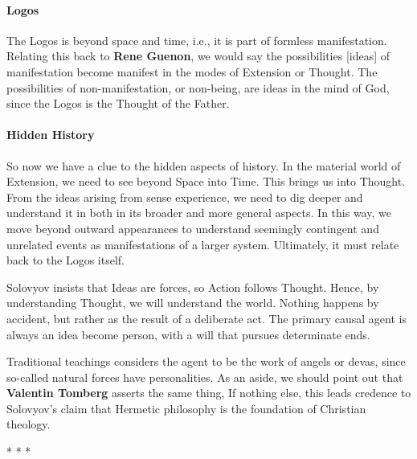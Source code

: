 \paragraph{Logos}
The Logos is beyond space and time, i.e., it is part of formless manifestation. Relating this back to \textbf{Rene Guenon}, we would say the possibilities [ideas] of manifestation become manifest in the modes of Extension or Thought. The possibilities of non-manifestation, or non-being, are ideas in the mind of God, since the Logos is the Thought of the Father.

\paragraph{Hidden History}
So now we have a clue to the hidden aspects of history. In the material world of Extension, we need to see beyond Space into Time. This brings us into Thought. From the ideas arising from sense experience, we need to dig deeper and understand it in both in its broader and more general aspects. In this way, we move beyond outward appearances to understand seemingly contingent and unrelated events as manifestations of a larger system. Ultimately, it must relate back to the Logos itself.

Solovyov insists that Ideas are forces, so Action follows Thought. Hence, by understanding Thought, we will understand the world. Nothing happens by accident, but rather as the result of a deliberate act. The primary causal agent is always an idea become person, with a will that pursues determinate ends.

Traditional teachings considers the agent to be the work of angels or devas, since so-called natural forces have personalities. As an aside, we should point out that \textbf{Valentin Tomberg} asserts the same thing, If nothing else, this leads credence to Solovyov's claim that Hermetic philosophy is the foundation of Christian theology.




\begin{center}* * *\end{center}

